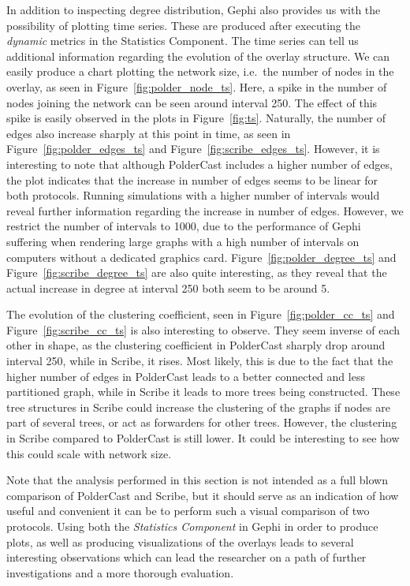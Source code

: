 In addition to inspecting degree distribution, Gephi also provides us
with the possibility of plotting time series. These are produced after
executing the \emph{dynamic} metrics in the Statistics Component.  The
time series can tell us additional information regarding the evolution
of the overlay structure. We can easily produce a chart plotting the
network size, i.e.\ the number of nodes in the overlay, as seen in
Figure~\ref{fig:polder_node_ts}.  Here, a spike in the number of nodes
joining the network can be seen around interval 250. The effect of this
spike is easily observed in the plots in Figure~\ref{fig:ts}. Naturally,
the number of edges also increase sharply at this point in time, as seen
in Figure~\ref{fig:polder_edges_ts} and
Figure~\ref{fig:scribe_edges_ts}.  However, it is interesting to note
that although PolderCast includes a higher number of edges, the plot
indicates that the increase in number of edges seems to be linear for
both protocols. Running simulations with a higher number of intervals
would reveal further information regarding the increase in number of
edges. However, we restrict the number of intervals to 1000, due to the
performance of Gephi suffering when rendering large graphs with a high
number of intervals on computers without a dedicated graphics card.
Figure~\ref{fig:polder_degree_ts} and Figure~\ref{fig:scribe_degree_ts}
are also quite interesting, as they reveal that the actual increase in
degree at interval 250 both seem to be around 5.

The evolution of the clustering coefficient, seen in
Figure~\ref{fig:polder_cc_ts} and Figure~\ref{fig:scribe_cc_ts} is also
interesting to observe. They seem inverse of each other in shape, as the
clustering coefficient in PolderCast sharply drop around interval 250,
while in Scribe, it rises. Most likely, this is due to the fact that the
higher number of edges in PolderCast leads to a better connected and
less partitioned graph, while in Scribe it leads to more trees being
constructed. These tree structures in Scribe could increase the
clustering of the graphs if nodes are part of several trees, or act as
forwarders for other trees. However, the clustering in Scribe compared
to PolderCast is still lower. It could be interesting to see how this
could scale with network size.

Note that the analysis performed in this section is not intended as a
full blown comparison of PolderCast and Scribe, but it should serve as
an indication of how useful and convenient it can be to perform such a
visual comparison of two protocols. Using both the \emph{Statistics
    Component} in Gephi in order to produce plots, as well as producing
visualizations of the overlays leads to several interesting observations
which can lead the researcher on a path of further investigations and a
more thorough evaluation.

